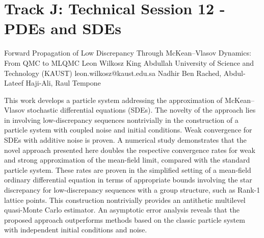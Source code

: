 \section{Track J: Technical Session 12 - PDEs and SDEs}\newpage

\begin{talk}
  {Forward Propagation of Low Discrepancy Through McKean--Vlasov Dynamics: From QMC to MLQMC}%
  {Leon Wilkosz}%
  {King Abdullah University of Science and Technology (KAUST)}%
  {leon.wilkosz@kaust.edu.sa}%
  {Nadhir Ben Rached, Abdul-Lateef Haji-Ali, Raul Tempone}%
  
    
   
This work develops a particle system addressing the approximation of \linebreak McKean--Vlasov stochastic differential equations (SDEs). The novelty of the approach lies in involving low-discrepancy sequences nontrivially in the construction of a particle system with coupled noise and initial conditions. Weak convergence for SDEs with additive noise is proven. A numerical study demonstrates that the novel approach presented here doubles the respective convergence rates for weak and strong approximation of the mean-field limit, compared with the standard particle system. These rates are proven in the simplified setting of a mean-field ordinary differential equation in terms of appropriate bounds involving the star discrepancy for low-discrepancy sequences with a group structure, such as Rank-1 lattice points. This construction nontrivially provides an antithetic multilevel quasi-Monte Carlo estimator. An asymptotic error analysis reveals that the proposed approach outperforms methods based on the classic particle system with independent initial conditions and noise.
\end{talk}

